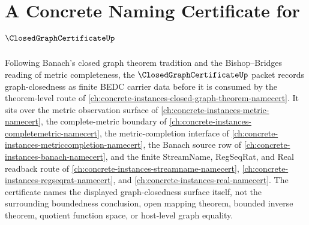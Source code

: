 \chapter{A Concrete Naming Certificate for $\ClosedGraphCertificateUp$}
\label{ch:concrete-instances-closed-graph-certificate-namecert}

Following Banach's closed graph theorem tradition and the Bishop--Bridges reading of metric completeness, the $\ClosedGraphCertificateUp$ packet records graph-closedness as finite BEDC carrier data before it is consumed by the theorem-level route of \autoref{ch:concrete-instances-closed-graph-theorem-namecert}. It sits over the metric observation surface of \autoref{ch:concrete-instances-metric-namecert}, the complete-metric boundary of \autoref{ch:concrete-instances-completemetric-namecert}, the metric-completion interface of \autoref{ch:concrete-instances-metriccompletion-namecert}, the Banach source row of \autoref{ch:concrete-instances-banach-namecert}, and the finite StreamName, RegSeqRat, and Real readback route of \autoref{ch:concrete-instances-streamname-namecert}, \autoref{ch:concrete-instances-regseqrat-namecert}, and \autoref{ch:concrete-instances-real-namecert}. The certificate names the displayed graph-closedness surface itself, not the surrounding boundedness conclusion, open mapping theorem, bounded inverse theorem, quotient function space, or host-level graph equality.

